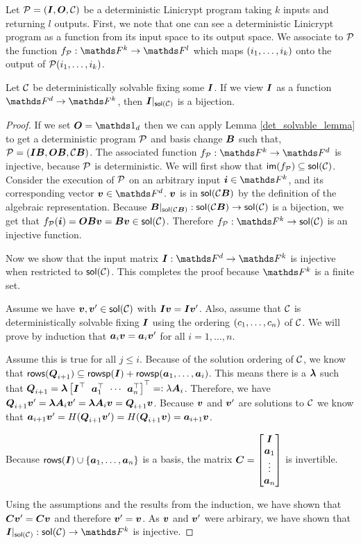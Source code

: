 Let $\P = (\I, \O, \C)$ be a deterministic Linicrypt program taking $k$ inputs and returning $l$ outputs.
First, we note that one can see a deterministic Linicrypt program as a function from its input space to its output space.
We associate to $\P$ the function $f_\P: \F^k \to \F^l$ which maps $(\dts i k)$ onto the output of $\P(\dts i k)$.

\begin{lemma}
\label{lemma:solution_space_bijection}
    Let $\C$ be deterministically solvable fixing some $\I$.
    If we view $\I$ as a function $\Fsp \to \F^k$,
    then $\I|_{\sol(\C)}$ is a bijection.
\end{lemma}

\begin{proof}
    If we set $\O = \Id_\base$
    then we can apply Lemma \ref{det_solvable_lemma} to get a deterministic program $\P$ and basis change $\B$ such that,
    $\P = (\I\B, \O\B, \C\B)$. 
    The associated function $f_{\P}: \F^k \to \F^\base$ is injective,
    because $\P$ is deterministic.
    We will first show that $\im(f_\P) \subseteq \sol(\C)$.
    Consider the execution of $\P$ on an arbitrary input $\vi \in \F^k$, and
    its corresponding vector $\vv \in \Fsp$.
$\vv$ is in $\sol(\C\B)$ by the definition of the algebraic representation.
    Because $\B|_{\sol(\C\B)}: \sol(\C\B) \to \sol(\C)$ is a bijection,
    we get that $f_\P(\vi) = \O\B\vv = \B\vv \in \sol(\C)$.
    Therefore $f_\P: \F^k \to \sol(\C)$ is an injective function.
    
    Now we show that the input matrix $\I: \Fsp \to \F^k$ is injective when restricted to $\sol(\C)$.
    This completes the proof because $\F^k$ is a finite set.
    
    Assume we have $\vv, \vv' \in \sol(\C)$ with $\I\vv = \I\vv'$.
    Also, assume that $\C$ is deterministically solvable fixing $\I$
    using the ordering $(\dts c n)$ of $\C$.
    We will prove by induction that $\va_i \vv = \va_i \vv'$ for all $i = 1, \dots, n$.

    Assume this is true for all $ j \leq i$.
    Because of the solution ordering of $\C$, we know that
    $\rows(\Q_{i+1}) \subseteq \rowsp(\I) + \rowsp(\dts \va {i})$. 
    This means there is a $\v \lambda$ such that $\Q_{i+1} = \v \lambda \m{\I^\top & \va_1^\top & \cdots & \va_n^\top}^\top =: \lambda \v A_i$.
    Therefore, we have $\Q_{i+1} \vv' = \vl \v A_i \vv' = \vl \v A_i \vv = \Q_{i+1} \vv$.
    Because $\vv$ and $\vv'$ are solutions to $\C$ we know that
    $\va_{i+1}\vv' = \H(\Q_{i+1}\vv') = \H(\Q_{i+1}\vv) = \va_{i+1}\vv$.

    Because $\rows(\I) \cup \{\va_1, \dots, \va_n\}$ is a basis, 
    the matrix 
    $
    \v C = \m{\I \\ \vdts \va n}
    $
    is invertible.

    Using the assumptions and the results from the induction, we have shown that $\v C \vv' = \v C \vv$ and
    therefore $\vv' = \vv$.
    As $\vv$ and $\vv'$ were arbirary, we have shown that $\I|_{\sol(\C)}: \sol(\C) \to \F^k$ is injective.
\end{proof}


